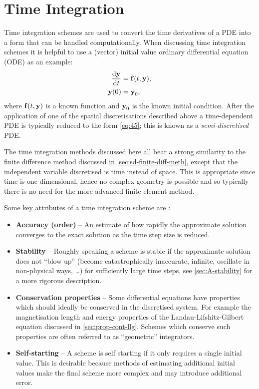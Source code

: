 \section{Time Integration}
\label{sec:time-discretisation}

Time integration schemes are used to convert the time derivatives of a PDE into a form that can be handled computationally.
When discussing time integration schemes it is helpful to use a (vector) initial value ordinary differential equation (ODE) as an example:
\begin{equation}
  \begin{aligned}
  \frac{\textrm{d} \boldsymbol{\mathrm{y}}}{\textrm{d}t} &= {\boldsymbol{\mathrm{f}}{\left( t, \boldsymbol{\mathrm{y}} \right)}}, \\
  \boldsymbol{\mathrm{y}}(0) &= \boldsymbol{\mathrm{y}}_0,
  \label{eq:45}
  \end{aligned}
\end{equation}
where ${\boldsymbol{\mathrm{f}}}(t,\boldsymbol{\mathrm{y}})$ is a known function and $\boldsymbol{\mathrm{y}}_0$ is the known initial condition.
After the application of one of the spatial discretisations described above a time-dependent PDE is typically reduced to the form \cref{eq:45}; this is known as a \emph{semi-discretised} PDE.

The time integration methods discussed here all bear a strong similarity to the finite difference method discussed in \cref{sec:sd-finite-diff-meth}, except that the independent variable discretised is time instead of space.
This is appropriate since time is one-dimensional, hence no complex geometry is possible and so typically there is no need for the more advanced finite element method.

Some key attributes of a time integration scheme are \cite{Atkinson2009}:
\begin{itemize}
\item \textbf{Accuracy (order)} -- An estimate of how rapidly the approximate solution converges to the exact solution as the time step size is reduced.

\item \textbf{Stability} -- Roughly speaking a scheme is stable if the approximate solution does not ``blow up'' (\ie become catastrophically inaccurate, infinite, oscillate in non-physical ways, \ldots) for sufficiently large time steps, see \cref{sec:A-stability} for a more rigorous description.

\item \textbf{Conservation properties} -- Some differential equations have properties which should ideally be conserved in the discretised system.
For example the magnetisation length and energy properties of the Landau-Lifshitz-Gilbert equation discussed in \cref{sec:prop-cont-llg}.
Schemes which conserve such properties are often referred to as ``geometric'' integrators.

\item \textbf{Self-starting} -- A scheme is self starting if it only requires a single initial value.
This is desirable because methods of estimating additional initial values make the final scheme more complex and may introduce additional error.
\end{itemize}

